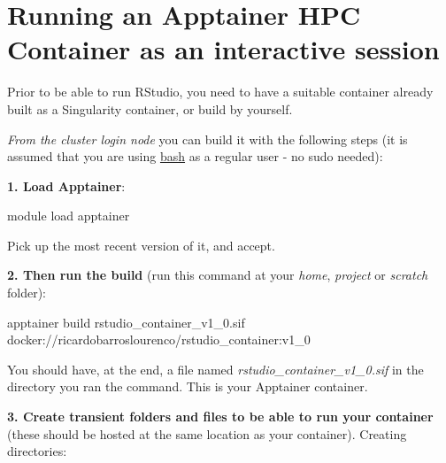 \documentclass[
]{book}
\newenvironment{Shaded}{\begin{snugshade}}{\end{snugshade}}
\newcommand{\AttributeTok}[1]{\textcolor[rgb]{0.77,0.63,0.00}{#1}}
\newcommand{\ExtensionTok}[1]{#1}
\newcommand{\NormalTok}[1]{#1}
\begin{document}
\hypertarget{running-an-apptainer-hpc-container-as-an-interactive-session}{%
\section{Running an Apptainer HPC Container as an interactive session}\label{running-an-apptainer-hpc-container-as-an-interactive-session}}

Prior to be able to run RStudio, you need to have a suitable container already built
as a Singularity container, or build by yourself.

\emph{From the cluster login node} you can build it with the following steps (it is assumed that you are using \href{https://en.wikipedia.org/wiki/Bash_(Unix_shell)}{bash} as a regular user - no sudo needed):

\textbf{1. Load Apptainer}:

\begin{Shaded}
\begin{Highlighting}[]
\ExtensionTok{module}\NormalTok{ load apptainer}
\end{Highlighting}
\end{Shaded}

Pick up the most recent version of it, and accept.

\textbf{2. Then run the build} (run this command at your \emph{home}, \emph{project} or \emph{scratch} folder):

\begin{Shaded}
\begin{Highlighting}[]
\ExtensionTok{apptainer}\NormalTok{ build rstudio\_container\_v1\_0.sif docker://ricardobarroslourenco/rstudio\_container:v1\_0}
\end{Highlighting}
\end{Shaded}

You should have, at the end, a file named \emph{rstudio\_container\_v1\_0.sif} in the
directory you ran the command. This is your Apptainer container.

\textbf{3. Create transient folders and files to be able to run your container} (these should be hosted at the same location as your container). Creating directories:

\begin{Shaded}
\end{Shaded}
\end{document}
